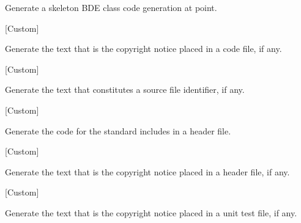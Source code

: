 \begin{doc-string}
Generate a skeleton BDE class code generation at point.
\end{doc-string}

\vspace{1em}
\noindent
{}
\usebox{\funcname}
 \hfill [Custom]

\begin{doc-string}
Generate the text that is the copyright notice placed in a code file,
if any.
\end{doc-string}

\vspace{1em}
\noindent
{}
\usebox{\funcname}
 \hfill [Custom]

\begin{doc-string}
Generate the text that constitutes a source file identifier, if any.
\end{doc-string}

\vspace{1em}
\noindent
{}
\usebox{\funcname}
 \hfill [Custom]

\begin{doc-string}
Generate the code for the standard includes in a header file.
\end{doc-string}

\vspace{1em}
\noindent
{}
\usebox{\funcname}
 \hfill [Custom]

\begin{doc-string}
Generate the text that is the copyright notice placed in a header file,
if any.
\end{doc-string}

\vspace{1em}
\noindent
{}
\usebox{\funcname}
 \hfill [Custom]

\begin{doc-string}
Generate the text that is the copyright notice placed in a unit test
file, if any.
\end{doc-string}

